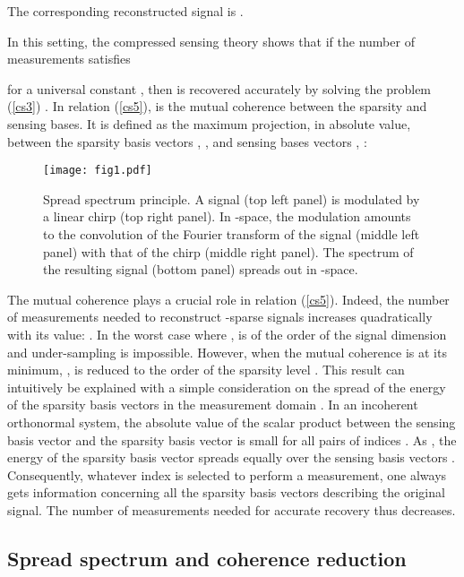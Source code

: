 \documentclass[10pt,draftcls, onecolumn]{IEEEtran}
\begin{document}
The corresponding reconstructed signal is . 

In this setting, the compressed sensing theory shows that if the number of measurements satisfies

for a universal constant , then  is recovered accurately by solving the  problem (\ref{cs3}) \cite{rauhut10}. In relation (\ref{cs5}),  is the mutual coherence between the sparsity and sensing bases. It is defined as the maximum projection, in absolute value, between the sparsity basis vectors , , and sensing bases vectors  ,  \cite{candes07, rauhut10}:



\begin{figure}
\centering
\texttt{[image: fig1.pdf]}
\caption{\label{fig:ssp principle} Spread spectrum principle. A signal  (top left panel) is modulated by a linear chirp (top right panel). In -space, the modulation amounts to the convolution of the Fourier transform of the signal (middle left panel) with that of the chirp (middle right panel). The spectrum of the resulting signal (bottom panel) spreads out in -space.}
\vspace{-1mm}
\end{figure}


The mutual coherence  plays a crucial role in relation (\ref{cs5}). Indeed, the number of measurements  needed to reconstruct -sparse signals increases quadratically with its value: . In the worst case where ,  is of the order of the signal dimension  and under-sampling is impossible. However, when the mutual coherence is at its minimum, ,  is reduced to the order of the sparsity level . This result can intuitively be explained with a simple consideration on the spread of the energy of the sparsity basis vectors in the measurement domain . In an incoherent orthonormal system, the absolute value of the scalar product between the sensing basis vector  and the sparsity basis vector  is small for all pairs of indices . As , the energy of the sparsity basis vector  spreads equally over the sensing basis vectors . Consequently, whatever index  is selected to perform a measurement, one always gets information concerning all the sparsity basis vectors describing the original signal. The number of measurements needed for accurate recovery thus decreases.

\subsection{Spread spectrum and coherence reduction}
\label{sub:spread spectrum and coherence}
\end{document}
